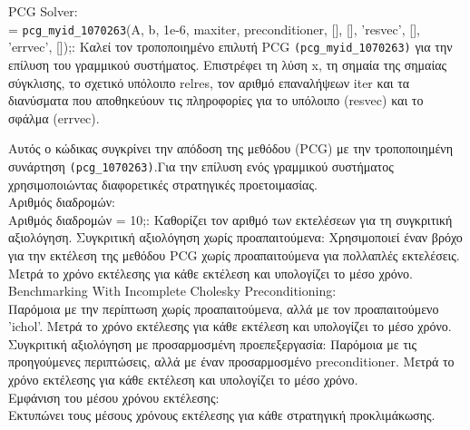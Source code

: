 \documentclass[12pt,a4paper]{article}
\begin{document}
PCG Solver:\\
[x, flag, relres, iter, resvec, errvec] = \texttt{pcg\_myid\_1070263}(A, b, 1e-6, maxiter, preconditioner, [], [], 'resvec', [], 'errvec', []);:  Καλεί τον τροποποιημένο επιλυτή PCG \texttt{(pcg\_myid\_1070263)} για την επίλυση του γραμμικού συστήματος. Επιστρέφει τη λύση x, τη σημαία της σημαίας σύγκλισης, το σχετικό υπόλοιπο relres, τον αριθμό επαναλήψεων iter και τα διανύσματα που αποθηκεύουν τις πληροφορίες για το υπόλοιπο (resvec) και το σφάλμα (errvec).

Αυτός ο κώδικας συγκρίνει την απόδοση της μεθόδου (PCG) με την τροποποιημένη συνάρτηση \texttt{(pcg\_1070263)}.Για την επίλυση ενός γραμμικού συστήματος χρησιμοποιώντας διαφορετικές στρατηγικές προετοιμασίας.\\

Αριθμός διαδρομών:\\
Αριθμός διαδρομών = 10;: Καθορίζει τον αριθμό των εκτελέσεων για τη συγκριτική αξιολόγηση.
Συγκριτική αξιολόγηση χωρίς προαπαιτούμενα:
Χρησιμοποιεί έναν βρόχο για την εκτέλεση της μεθόδου PCG χωρίς προαπαιτούμενα για πολλαπλές εκτελέσεις.
Μετρά το χρόνο εκτέλεσης για κάθε εκτέλεση και υπολογίζει το μέσο χρόνο.\\

Benchmarking With Incomplete Cholesky Preconditioning:\\
Παρόμοια με την περίπτωση χωρίς προαπαιτούμενα, αλλά με τον προαπαιτούμενο 'ichol'.
Μετρά το χρόνο εκτέλεσης για κάθε εκτέλεση και υπολογίζει το μέσο χρόνο.
Συγκριτική αξιολόγηση με προσαρμοσμένη προεπεξεργασία:
Παρόμοια με τις προηγούμενες περιπτώσεις, αλλά με έναν προσαρμοσμένο preconditioner.
Μετρά το χρόνο εκτέλεσης για κάθε εκτέλεση και υπολογίζει το μέσο χρόνο.\\

Εμφάνιση του μέσου χρόνου εκτέλεσης:\\
Εκτυπώνει τους μέσους χρόνους εκτέλεσης για κάθε στρατηγική προκλιμάκωσης.\\
\end{document}
